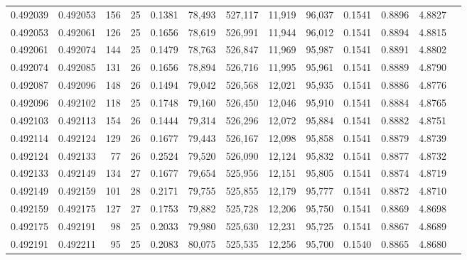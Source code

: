 \begin{tabular}{rrrrrrrrrrrrr}
0.492039 & 0.492053 & 156 &  25 &                                     0.1381 &  78,493 & 527,117 &  11,919 &  96,037 & 0.1541 & 0.8896 & 4.8827 \\
0.492053 & 0.492061 & 126 &  25 &                                     0.1656 &  78,619 & 526,991 &  11,944 &  96,012 & 0.1541 & 0.8894 & 4.8815 \\
0.492061 & 0.492074 & 144 &  25 &                                     0.1479 &  78,763 & 526,847 &  11,969 &  95,987 & 0.1541 & 0.8891 & 4.8802 \\
0.492074 & 0.492085 & 131 &  26 &                                     0.1656 &  78,894 & 526,716 &  11,995 &  95,961 & 0.1541 & 0.8889 & 4.8790 \\
0.492087 & 0.492096 & 148 &  26 &                                     0.1494 &  79,042 & 526,568 &  12,021 &  95,935 & 0.1541 & 0.8886 & 4.8776 \\
0.492096 & 0.492102 & 118 &  25 &                                     0.1748 &  79,160 & 526,450 &  12,046 &  95,910 & 0.1541 & 0.8884 & 4.8765 \\
0.492103 & 0.492113 & 154 &  26 &                                     0.1444 &  79,314 & 526,296 &  12,072 &  95,884 & 0.1541 & 0.8882 & 4.8751 \\
0.492114 & 0.492124 & 129 &  26 &                                     0.1677 &  79,443 & 526,167 &  12,098 &  95,858 & 0.1541 & 0.8879 & 4.8739 \\
0.492124 & 0.492133 &  77 &  26 &                                     0.2524 &  79,520 & 526,090 &  12,124 &  95,832 & 0.1541 & 0.8877 & 4.8732 \\
0.492133 & 0.492149 & 134 &  27 &                                     0.1677 &  79,654 & 525,956 &  12,151 &  95,805 & 0.1541 & 0.8874 & 4.8719 \\
0.492149 & 0.492159 & 101 &  28 &                                     0.2171 &  79,755 & 525,855 &  12,179 &  95,777 & 0.1541 & 0.8872 & 4.8710 \\
0.492159 & 0.492175 & 127 &  27 &                                     0.1753 &  79,882 & 525,728 &  12,206 &  95,750 & 0.1541 & 0.8869 & 4.8698 \\
0.492175 & 0.492191 &  98 &  25 &                                     0.2033 &  79,980 & 525,630 &  12,231 &  95,725 & 0.1541 & 0.8867 & 4.8689 \\
0.492191 & 0.492211 &  95 &  25 &                                     0.2083 &  80,075 & 525,535 &  12,256 &  95,700 & 0.1540 & 0.8865 & 4.8680 \\

\end{tabular}
